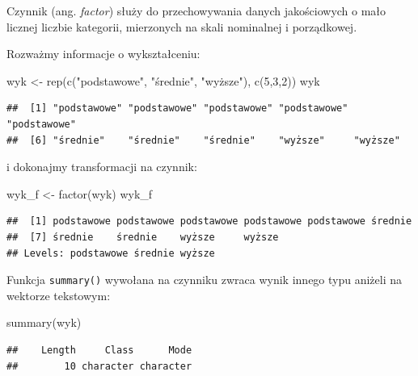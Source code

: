 \documentclass[
]{book}
\newenvironment{Shaded}{\begin{snugshade}}{\end{snugshade}}
\newcommand{\DecValTok}[1]{\textcolor[rgb]{0.00,0.00,0.81}{#1}}
\newcommand{\FunctionTok}[1]{\textcolor[rgb]{0.00,0.00,0.00}{#1}}
\newcommand{\NormalTok}[1]{#1}
\newcommand{\OtherTok}[1]{\textcolor[rgb]{0.56,0.35,0.01}{#1}}
\newcommand{\StringTok}[1]{\textcolor[rgb]{0.31,0.60,0.02}{#1}}
\begin{document}
Czynnik (ang. \emph{factor}) służy do przechowywania danych jakościowych o mało licznej liczbie kategorii, mierzonych na skali nominalnej i porządkowej.

Rozważmy informacje o wykształceniu:

\begin{Shaded}
\begin{Highlighting}[]
\NormalTok{wyk }\OtherTok{\textless{}{-}} \FunctionTok{rep}\NormalTok{(}\FunctionTok{c}\NormalTok{(}\StringTok{"podstawowe"}\NormalTok{, }\StringTok{"średnie"}\NormalTok{, }\StringTok{"wyższe"}\NormalTok{), }\FunctionTok{c}\NormalTok{(}\DecValTok{5}\NormalTok{,}\DecValTok{3}\NormalTok{,}\DecValTok{2}\NormalTok{))}
\NormalTok{wyk}
\end{Highlighting}
\end{Shaded}

\begin{verbatim}
##  [1] "podstawowe" "podstawowe" "podstawowe" "podstawowe" "podstawowe"
##  [6] "średnie"    "średnie"    "średnie"    "wyższe"     "wyższe"
\end{verbatim}

i dokonajmy transformacji na czynnik:

\begin{Shaded}
\begin{Highlighting}[]
\NormalTok{wyk\_f }\OtherTok{\textless{}{-}} \FunctionTok{factor}\NormalTok{(wyk)}
\NormalTok{wyk\_f}
\end{Highlighting}
\end{Shaded}

\begin{verbatim}
##  [1] podstawowe podstawowe podstawowe podstawowe podstawowe średnie   
##  [7] średnie    średnie    wyższe     wyższe    
## Levels: podstawowe średnie wyższe
\end{verbatim}

Funkcja \texttt{summary()} wywołana na czynniku zwraca wynik innego typu aniżeli na wektorze tekstowym:

\begin{Shaded}
\begin{Highlighting}[]
\FunctionTok{summary}\NormalTok{(wyk)}
\end{Highlighting}
\end{Shaded}

\begin{verbatim}
##    Length     Class      Mode 
##        10 character character
\end{verbatim}
\end{document}
